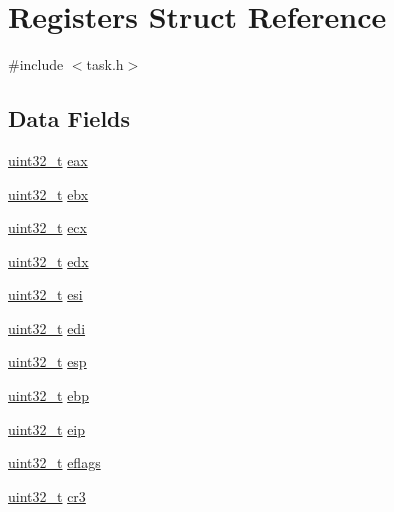 \hypertarget{a00132}{}\section{Registers Struct Reference}
\label{a00132}


{\ttfamily \#include $<$task.\+h$>$}

\subsection*{Data Fields}
\begin{DoxyCompactItemize}
\item 
\hyperlink{a00095_a435d1572bf3f880d55459d9805097f62_a435d1572bf3f880d55459d9805097f62}{uint32\+\_\+t} \hyperlink{a00132_aafc7189a84cb0f6ed3d37ee82bec09bc_aafc7189a84cb0f6ed3d37ee82bec09bc}{eax}
\item 
\hyperlink{a00095_a435d1572bf3f880d55459d9805097f62_a435d1572bf3f880d55459d9805097f62}{uint32\+\_\+t} \hyperlink{a00132_a3aa9baab41ed6c513cbecb126dc90373_a3aa9baab41ed6c513cbecb126dc90373}{ebx}
\item 
\hyperlink{a00095_a435d1572bf3f880d55459d9805097f62_a435d1572bf3f880d55459d9805097f62}{uint32\+\_\+t} \hyperlink{a00132_a9a7eb0450238154baa25c72993a0e5e0_a9a7eb0450238154baa25c72993a0e5e0}{ecx}
\item 
\hyperlink{a00095_a435d1572bf3f880d55459d9805097f62_a435d1572bf3f880d55459d9805097f62}{uint32\+\_\+t} \hyperlink{a00132_a0f90c64246d3bbb917cfe527bf8c34c4_a0f90c64246d3bbb917cfe527bf8c34c4}{edx}
\item 
\hyperlink{a00095_a435d1572bf3f880d55459d9805097f62_a435d1572bf3f880d55459d9805097f62}{uint32\+\_\+t} \hyperlink{a00132_a8f9b382cca633127cb869add3aed7a41_a8f9b382cca633127cb869add3aed7a41}{esi}
\item 
\hyperlink{a00095_a435d1572bf3f880d55459d9805097f62_a435d1572bf3f880d55459d9805097f62}{uint32\+\_\+t} \hyperlink{a00132_ae94bf35e0b978f6cca838ec6011a1e48_ae94bf35e0b978f6cca838ec6011a1e48}{edi}
\item 
\hyperlink{a00095_a435d1572bf3f880d55459d9805097f62_a435d1572bf3f880d55459d9805097f62}{uint32\+\_\+t} \hyperlink{a00132_aca352215ac1e37f833da4f6289392261_aca352215ac1e37f833da4f6289392261}{esp}
\item 
\hyperlink{a00095_a435d1572bf3f880d55459d9805097f62_a435d1572bf3f880d55459d9805097f62}{uint32\+\_\+t} \hyperlink{a00132_a1e7101b224fc3550bd4b64bb39d83036_a1e7101b224fc3550bd4b64bb39d83036}{ebp}
\item 
\hyperlink{a00095_a435d1572bf3f880d55459d9805097f62_a435d1572bf3f880d55459d9805097f62}{uint32\+\_\+t} \hyperlink{a00132_ad5110c091e713dabd23f23a62d026c07_ad5110c091e713dabd23f23a62d026c07}{eip}
\item 
\hyperlink{a00095_a435d1572bf3f880d55459d9805097f62_a435d1572bf3f880d55459d9805097f62}{uint32\+\_\+t} \hyperlink{a00132_a5216970c0d34ab4b53881f583839c8f9_a5216970c0d34ab4b53881f583839c8f9}{eflags}
\item 
\hyperlink{a00095_a435d1572bf3f880d55459d9805097f62_a435d1572bf3f880d55459d9805097f62}{uint32\+\_\+t} \hyperlink{a00132_ab818d6f237e6d73d321339e6fcd66abf_ab818d6f237e6d73d321339e6fcd66abf}{cr3}
\end{DoxyCompactItemize}


